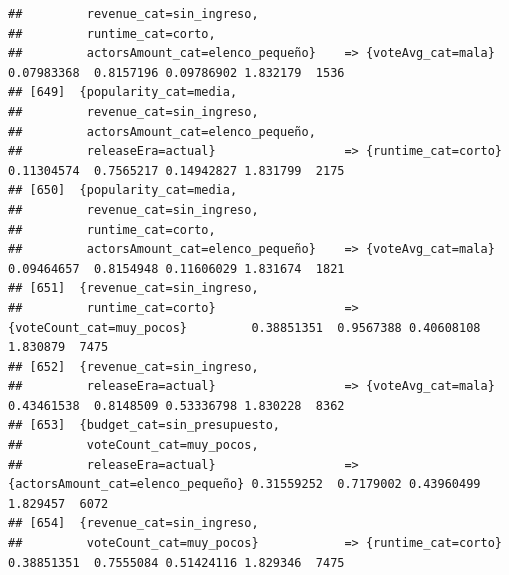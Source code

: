 \documentclass[
]{article}
\begin{document}
\begin{verbatim}
##         revenue_cat=sin_ingreso,                                                                                                
##         runtime_cat=corto,                                                                                                      
##         actorsAmount_cat=elenco_pequeño}    => {voteAvg_cat=mala}                0.07983368  0.8157196 0.09786902 1.832179  1536
## [649]  {popularity_cat=media,                                                                                                   
##         revenue_cat=sin_ingreso,                                                                                                
##         actorsAmount_cat=elenco_pequeño,                                                                                        
##         releaseEra=actual}                  => {runtime_cat=corto}               0.11304574  0.7565217 0.14942827 1.831799  2175
## [650]  {popularity_cat=media,                                                                                                   
##         revenue_cat=sin_ingreso,                                                                                                
##         runtime_cat=corto,                                                                                                      
##         actorsAmount_cat=elenco_pequeño}    => {voteAvg_cat=mala}                0.09464657  0.8154948 0.11606029 1.831674  1821
## [651]  {revenue_cat=sin_ingreso,                                                                                                
##         runtime_cat=corto}                  => {voteCount_cat=muy_pocos}         0.38851351  0.9567388 0.40608108 1.830879  7475
## [652]  {revenue_cat=sin_ingreso,                                                                                                
##         releaseEra=actual}                  => {voteAvg_cat=mala}                0.43461538  0.8148509 0.53336798 1.830228  8362
## [653]  {budget_cat=sin_presupuesto,                                                                                             
##         voteCount_cat=muy_pocos,                                                                                                
##         releaseEra=actual}                  => {actorsAmount_cat=elenco_pequeño} 0.31559252  0.7179002 0.43960499 1.829457  6072
## [654]  {revenue_cat=sin_ingreso,                                                                                                
##         voteCount_cat=muy_pocos}            => {runtime_cat=corto}               0.38851351  0.7555084 0.51424116 1.829346  7475

\end{verbatim}
\end{document}
